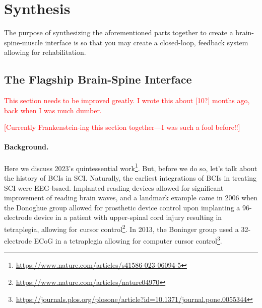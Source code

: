 
\chapter{Synthesis}

The purpose of synthesizing the aforementioned parts together to create a brain-spine-muscle interface is so that you may create a closed-loop, feedback system allowing for rehabilitation. 


\section{The Flagship Brain-Spine Interface} 
\textcolor{red}{This section needs to be improved greatly. I wrote this about [10?] months ago, back when I was much dumber.}\newline

\textcolor{red}{[Currently Frankenstein-ing this section together---I was such a fool before!!]}

\subsubsection{Background.} 

Here we discuss 2023's quintessential work\footnote{\url{https://www.nature.com/articles/s41586-023-06094-5}}. But, before we do so, let's talk about the history of BCIs in SCI. Naturally, the earliest integrations of BCIs in treating SCI were EEG-bsaed. Implanted reading devices allowed for significant improvement of reading brain waves, and a landmark example came in 2006 when the Donoghue group allowed for prosthetic device control upon implanting a 96-electrode device in a patient with upper-spinal cord injury resulting in tetraplegia, allowing for cursor control\footnote{\url{https://www.nature.com/articles/nature04970}}. In 2013, the Boninger group used a 32-electrode ECoG in a tetraplegia allowing for computer cursor control\footnote{\url{https://journals.plos.org/plosone/article?id=10.1371/journal.pone.0055344}}.\newline


